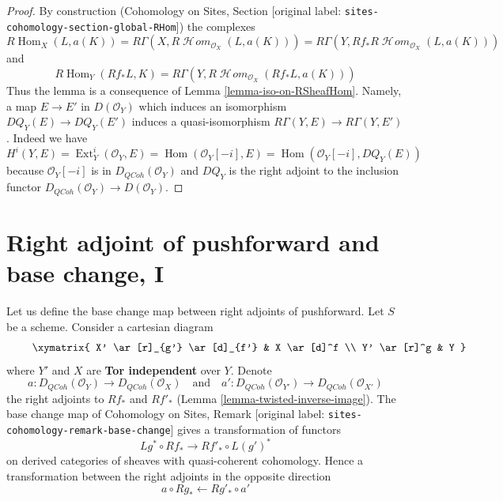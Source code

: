 \documentclass[10pt,a4paper]{article}
\theoremstyle{plain}
\theoremstyle{definition}
\theoremstyle{remark}
\numberwithin{equation}{subsection}
\def\Hom{\mathop{\mathrm{Hom}}\nolimits}
\def\Ext{\mathop{\mathrm{Ext}}\nolimits}
\def\SheafHom{\mathop{\mathcal{H}\!\mathit{om}}\nolimits}
\def\QCoh{\mathit{QCoh}}
\begin{document}
\begin{proof}
By construction (Cohomology on Sites, Section
\textnormal{[original label: \nolinkurl{sites-cohomology-section-global-RHom}]}) the complexes
$$
R\Hom_X(L, a(K)) =
R\Gamma(X, R\SheafHom_{\mathcal{O}_X}(L, a(K))) =
R\Gamma(Y, Rf_*R\SheafHom_{\mathcal{O}_X}(L, a(K)))
$$
and
$$
R\Hom_Y(Rf_*L, K) = R\Gamma(Y, R\SheafHom_{\mathcal{O}_X}(Rf_*L, a(K)))
$$
Thus the lemma is a consequence of Lemma \ref{lemma-iso-on-RSheafHom}.
Namely, a map $E \to E'$ in $D(\mathcal{O}_Y)$ which induces
an isomorphism $DQ_Y(E) \to DQ_Y(E')$ induces a quasi-isomorphism
$R\Gamma(Y, E) \to R\Gamma(Y, E')$. Indeed we have
$H^i(Y, E) = \Ext^i_Y(\mathcal{O}_Y, E) = \Hom(\mathcal{O}_Y[-i], E) =
\Hom(\mathcal{O}_Y[-i], DQ_Y(E))$ because $\mathcal{O}_Y[-i]$
is in $D_\QCoh(\mathcal{O}_Y)$ and $DQ_Y$ is the right adjoint
to the inclusion functor $D_\QCoh(\mathcal{O}_Y) \to D(\mathcal{O}_Y)$.
\end{proof}









\section{Right adjoint of pushforward and base change, I}
\label{section-base-change-map}

\noindent
Let us define the base change map between right adjoints of pushforward.
Let $S$ be a scheme. Consider a cartesian diagram
\begin{equation}
\label{equation-base-change}
\vcenter{
\xymatrix{
X' \ar[r]_{g'} \ar[d]_{f'} & X \ar[d]^f \\
Y' \ar[r]^g & Y
}
}
\end{equation}
where $Y'$ and $X$ are {\bf Tor independent} over $Y$. Denote
$$
a  : D_\QCoh(\mathcal{O}_Y) \to D_\QCoh(\mathcal{O}_X)
\quad\text{and}\quad
a' : D_\QCoh(\mathcal{O}_{Y'}) \to D_\QCoh(\mathcal{O}_{X'})
$$
the right adjoints to $Rf_*$ and $Rf'_*$
(Lemma \ref{lemma-twisted-inverse-image}).
The base change map of
Cohomology on Sites, Remark \textnormal{[original label: \nolinkurl{sites-cohomology-remark-base-change}]}
gives a transformation of functors
$$
Lg^* \circ Rf_* \longrightarrow Rf'_* \circ L(g')^*
$$
on derived categories of sheaves with quasi-coherent cohomology.
Hence a transformation between the right adjoints in the opposite direction
$$
a \circ Rg_* \longleftarrow Rg'_* \circ a'
$$
\end{document}
